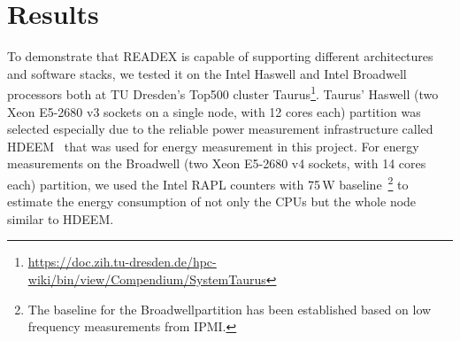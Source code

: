 \section{Results} \label{sec:results}
To demonstrate that READEX is capable of supporting different architectures and software stacks, we tested it on the Intel Haswell and Intel Broadwell processors both at TU Dresden's Top500 cluster Taurus\footnote{\url{https://doc.zih.tu-dresden.de/hpc-wiki/bin/view/Compendium/SystemTaurus}}. Taurus' Haswell (two Xeon E5-2680 v3 sockets on a single node, with 12 cores each) partition was selected especially due to the reliable power measurement infrastructure called HDEEM~\cite{hdeem} that was used for energy measurement in this project. For energy measurements on the Broadwell (two Xeon E5-2680 v4 sockets, with 14 cores each) partition, we used the Intel RAPL counters with 75\,W baseline~\footnote{The baseline for the Broadwellpartition has been established based on low frequency measurements from IPMI.} to estimate the energy consumption of not only the CPUs but the whole node similar to HDEEM.

